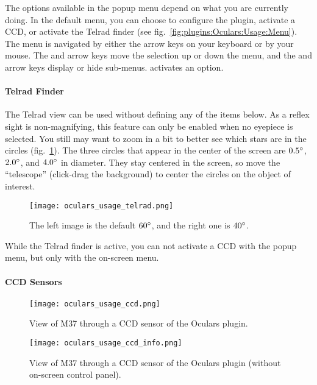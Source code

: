 The options available in the popup menu depend on what you are currently doing. 
In the default menu, you can choose to configure the plugin, activate a CCD, or activate the Telrad finder (see fig.~\ref{fig:plugins:Oculars:Usage:Menu}).
The menu is navigated by either the arrow keys on your keyboard or by your mouse. 
The \keys{\arrowkeyup} and \keys{\arrowkeydown} arrow keys move the selection up or down the menu, 
and the \keys{\arrowkeyleft} and \keys{\arrowkeyright}  arrow keys display or hide sub-menus. \keys{\return} activates an option.

\paragraph{Telrad Finder}

The Telrad view can be used without defining any of the items below. 
As a reflex sight is non-magnifying, this feature can only be enabled when no eyepiece is selected. 
You still may want to zoom in a bit to better see which stars are in the circles (fig.~\ref{fig:plugins:Oculars:Usage:Telrad}).
The three circles that appear in the center of the screen are $0.5\degree$, $2.0\degree$, and $4.0\degree$ in diameter. 
They stay centered in the screen, so move the ``telescope'' (click-drag the background) to center the circles on the object of interest. 

\begin{figure}[b]\centering
\texttt{[image: oculars\_usage\_telrad.png]}
\caption{The left image is the default $60\degree$, and the right one is $40\degree$.}
\label{fig:plugins:Oculars:Usage:Telrad}
\end{figure}

While the Telrad finder is active, you can not activate a CCD with the popup menu, but only with the on-screen menu.

\paragraph{CCD Sensors}


\begin{figure}[ht]\centering
\texttt{[image: oculars\_usage\_ccd.png]}
\caption{View of M37 through a CCD sensor of the Oculars plugin.}
\label{fig:plugins:Oculars:Usage:CCD}
\end{figure}

\begin{figure}[ht]\centering
\texttt{[image: oculars\_usage\_ccd\_info.png]}
\caption{View of M37 through a CCD sensor of the Oculars plugin (without on-screen control panel).}
\label{fig:plugins:Oculars:Usage:CCD:Info}
\end{figure}

